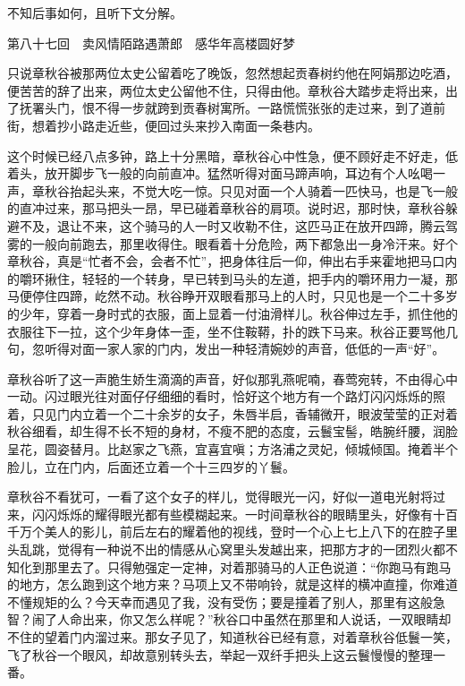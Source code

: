 \documentclass[12pt,UTF8]{ctexbook}
\begin{document}
{{{不知后事如何，且听下文分解。





第八十七回　卖风情陌路遇萧郎　感华年高楼圆好梦





只说章秋谷被那两位太史公留着吃了晚饭，忽然想起贡春树约他在阿娟那边吃酒，便苦苦的辞了出来，两位太史公留他不住，只得由他。章秋谷大踏步走将出来，出了抚署头门，恨不得一步就跨到贡春树寓所。一路慌慌张张的走过来，到了道前街，想着抄小路走近些，便回过头来抄入南面一条巷内。

这个时候已经八点多钟，路上十分黑暗，章秋谷心中性急，便不顾好走不好走，低着头，放开脚步飞一般的向前直冲。猛然听得对面马蹄声响，耳边有个人吆喝一声，章秋谷抬起头来，不觉大吃一惊。只见对面一个人骑着一匹快马，也是飞一般的直冲过来，那马把头一昂，早已碰着章秋谷的肩项。说时迟，那时快，章秋谷躲避不及，退让不来，这个骑马的人一时又收勒不住，这匹马正在放开四蹄，腾云驾雾的一般向前跑去，那里收得住。眼看着十分危险，两下都急出一身冷汗来。好个章秋谷，真是“忙者不会，会者不忙”，把身体往后一仰，伸出右手来霍地把马口内的嚼环揪住，轻轻的一个转身，早已转到马头的左道，把手内的嚼环用力一凝，那马便停住四蹄，屹然不动。秋谷睁开双眼看那马上的人时，只见也是一个二十多岁的少年，穿着一身时式的衣服，面上显着一付油滑样儿。秋谷伸过左手，抓住他的衣服往下一拉，这个少年身体一歪，坐不住鞍鞯，扑的跌下马来。秋谷正要骂他几句，忽听得对面一家人家的门内，发出一种轻清婉妙的声音，低低的一声“好”。

章秋谷听了这一声脆生娇生滴滴的声音，好似那乳燕呢喃，春莺宛转，不由得心中一动。闪过眼光往对面仔仔细细的看时，恰好这个地方有一个路灯闪闪烁烁的照着，只见门内立着一个二十余岁的女子，朱唇半启，香辅微开，眼波莹莹的正对着秋谷细看，却生得不长不短的身材，不瘦不肥的态度，云鬟宝髻，皓腕纤腰，润脸呈花，圆姿替月。比赵家之飞燕，宜喜宜嗔；方洛浦之灵妃，倾城倾国。掩着半个脸儿，立在门内，后面还立着一个十三四岁的丫鬟。

章秋谷不看犹可，一看了这个女子的样儿，觉得眼光一闪，好似一道电光射将过来，闪闪烁烁的耀得眼光都有些模糊起来。一时间章秋谷的眼睛里头，好像有十百千万个美人的影儿，前后左右的耀着他的视线，登时一个心上七上八下的在腔子里头乱跳，觉得有一种说不出的情感从心窝里头发越出来，把那方才的一团烈火都不知化到那里去了。只得勉强定一定神，对着那骑马的人正色说道：“你跑马有跑马的地方，怎么跑到这个地方来？马项上又不带响铃，就是这样的横冲直撞，你难道不懂规矩的么？今天幸而遇见了我，没有受伤；要是撞着了别人，那里有这般急智？闹了人命出来，你又怎么样呢？”秋谷口中虽然在那里和人说话，一双眼睛却不住的望着门内溜过来。那女子见了，知道秋谷已经有意，对着章秋谷低鬟一笑，飞了秋谷一个眼风，却故意别转头去，举起一双纤手把头上这云鬟慢慢的整理一番。

}}}
\end{document}
